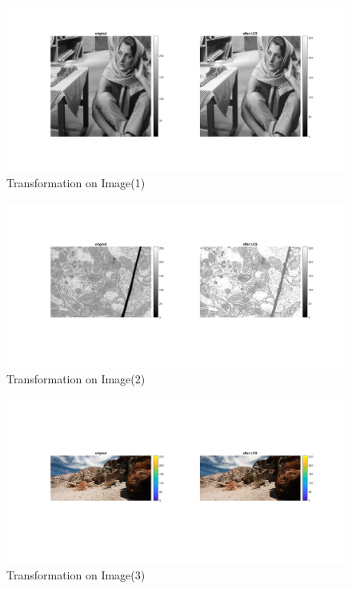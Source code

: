 \documentclass[12pt, a4paper]{article}
\begin{document}
\renewcommand{\thefigure}{2.1}
\begin{figure}[H]
    \centering
    \includegraphics[width=\textwidth]{b1.jpg}
    \vspace*{-55pt}
    \caption{Transformation on Image(1)}
    \label{fig:2.1}
\end{figure}
\renewcommand{\thefigure}{2.2}
\begin{figure}[H]
    \centering
    \vspace*{-30pt}
    \includegraphics[width=\textwidth]{b2.jpg}
    \vspace*{-70pt}
    \caption{Transformation on Image(2)}
    \label{fig:2.2}
\end{figure}
\renewcommand{\thefigure}{2.3}
\begin{figure}[H]
    \centering
    \vspace*{-30pt}
    \includegraphics[width=\textwidth]{b3.jpg}
    \vspace*{-90pt}
    \caption{Transformation on Image(3)}
    \label{fig:2.3}
\end{figure}
\end{document}
